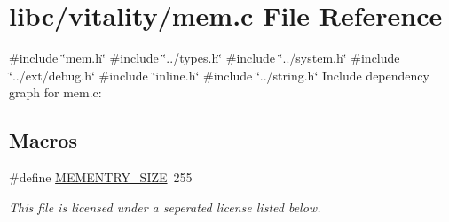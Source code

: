 \hypertarget{a00107}{}\section{libc/vitality/mem.c File Reference}
\label{a00107}
{\ttfamily \#include \char`\"{}mem.\+h\char`\"{}}\newline
{\ttfamily \#include \char`\"{}../types.\+h\char`\"{}}\newline
{\ttfamily \#include \char`\"{}../system.\+h\char`\"{}}\newline
{\ttfamily \#include \char`\"{}../ext/debug.\+h\char`\"{}}\newline
{\ttfamily \#include \char`\"{}inline.\+h\char`\"{}}\newline
{\ttfamily \#include \char`\"{}../string.\+h\char`\"{}}\newline
Include dependency graph for mem.\+c\+:
\subsection*{Macros}
\begin{DoxyCompactItemize}
\item 
\#define \hyperlink{a00107_a48623ea6ed429e2f046b49041dde1dc5_a48623ea6ed429e2f046b49041dde1dc5}{M\+E\+M\+E\+N\+T\+R\+Y\+\_\+\+S\+I\+ZE}~255
\begin{DoxyCompactList}\small\item\em This file is licensed under a seperated license listed below. \end{DoxyCompactList}\end{DoxyCompactItemize}
